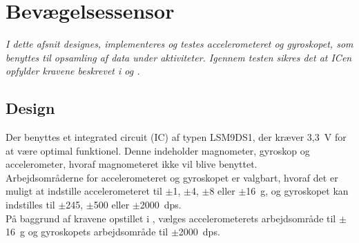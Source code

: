 \section{Bevægelsessensor}\label{sec_design_LSM9DS1}
\textit{I dette afsnit designes, implementeres og testes accelerometeret og gyroskopet, som benyttes til opsamling af data under aktiviteter. Igennem testen sikres det at ICen opfylder kravene beskrevet i  og .}

\subsection{Design} \label{design_lsm}
Der benyttes et integrated circuit (IC) af typen LSM9DS1, der kræver 3,3~V for at være optimal funktionel. Denne indeholder magnometer, gyroskop og accelerometer, hvoraf magnometeret ikke vil blive benyttet. \\ 
Arbejdsområderne for accelerometeret og gyroskopet er valgbart, hvoraf det er muligt at indstille accelerometeret til $\pm$1, $\pm$4, $\pm$8 eller $\pm$16~g, og gyroskopet kan indstilles til $\pm$245, $\pm$500 eller $\pm$2000~dps. \citep{Jimb02016,STMicroelectronics2016} \\
På baggrund af kravene opstillet i , vælges accelerometerets arbejdsområde til $\pm$16~g og gyroskopets arbejdsområde til $\pm$2000~dps. 

